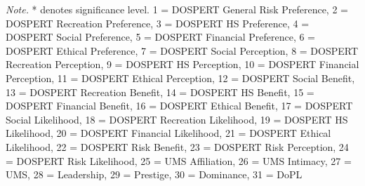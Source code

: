 \documentclass[
  donotrepeattitle,doc, 12pt, a4paper,floatsintext]{apa7}
\newenvironment{lltable}{\begin{landscape}\centering\begin{ThreePartTable}}{\end{ThreePartTable}\end{landscape}}
\begin{document}
\begin{lltable}

\begin{TableNotes}[para]
\normalsize{\textit{Note.}  * denotes significance level. 1 = DOSPERT General Risk Preference, 2 = DOSPERT Recreation Preference, 3 = DOSPERT HS Preference, 4 = DOSPERT Social Preference, 5 = DOSPERT Financial Preference, 6 = DOSPERT Ethical Preference, 7 = DOSPERT Social Perception, 8 = DOSPERT Recreation Perception, 9 = DOSPERT HS Perception, 10 = DOSPERT Financial Perception, 11 = DOSPERT Ethical Perception, 12 = DOSPERT Social Benefit, 13 = DOSPERT Recreation Benefit, 14 = DOSPERT HS Benefit, 15 = DOSPERT Financial Benefit, 16 = DOSPERT Ethical Benefit, 17 = DOSPERT Social Likelihood, 18 = DOSPERT Recreation Likelihood, 19 = DOSPERT HS Likelihood, 20 = DOSPERT Financial Likelihood, 21 = DOSPERT Ethical Likelihood, 22 = DOSPERT Risk Benefit, 23 = DOSPERT Risk Perception, 24 = DOSPERT Risk Likelihood, 25 = UMS Affiliation, 26 = UMS Intimacy, 27 = UMS, 28 = Leadership, 29 = Prestige, 30 = Dominance, 31 = DoPL}
\end{TableNotes}

\tiny{

}
\end{lltable}
\end{document}
